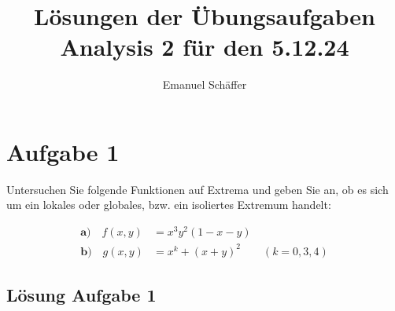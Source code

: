 \documentclass[ngerman, a4paper]{scrartcl}
\begin{document}
	\title{Lösungen der Übungsaufgaben Analysis 2 für den 5.12.24}
	\author{Emanuel Schäffer}
	\maketitle
	
	\section*{Aufgabe 1}
	Untersuchen Sie folgende Funktionen auf Extrema und geben Sie an, ob es sich um ein lokales oder globales, bzw. ein isoliertes Extremum handelt:
	
	\begin{align*}
		\textbf{a)} \quad f(x,y) &= x^3y^2(1-x-y)\\
		\textbf{b)} \quad g(x,y) &= x^k+(x+y)^2 \qquad (k=0,3,4)
	\end{align*}
	
	\subsection*{Lösung Aufgabe 1}
	
\end{document}
